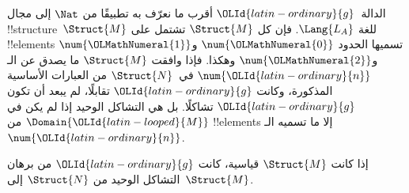 \documentclass[../../../include/open-logic-section]{subfiles}
\begin{document}
\begin{explain}
الدالة~${\OLId{latin-ordinary}{g}}$ أقرب ما نعرّف به تطبيقًا من $\Nat$ إلى مجال
!!{structure}~$\Struct{M}$ للغة $\Lang{L_A}$. فإن كل
$\Struct{M}$ تشتمل على !!{element}s تسميها الحدود
$\num{{\OLMathNumeral{0}}}$ و$\num{{\OLMathNumeral{1}}}$ و$\num{{\OLMathNumeral{2}}}$ وهكذا. فإذا وافقت $\Struct{M}$
ما يصدق عن الـ$\num{{\OLId{latin-ordinary}{n}}}$ في~$\Struct{N}$ من العبارات الأساسية
المذكورة، وكانت ${\OLId{latin-ordinary}{g}}$ تقابلًا، لم يبعد أن تكون ${\OLId{latin-ordinary}{g}}$ تشاكلًا.
بل هي التشاكل الوحيد إذا لم يكن في $\Domain{{\OLId{latin-looped}{M}}}$ من
!!{element}s إلا ما تسميه الـ$\num{{\OLId{latin-ordinary}{n}}}$.
\end{explain}

\begin{prop}
 إذا كانت $\Struct{M}$ قياسية، كانت ${\OLId{latin-ordinary}{g}}$ من
برهان  التشاكل الوحيد من $\Struct{N}$ إلى~$\Struct{M}$.
\end{prop}
\end{document}
